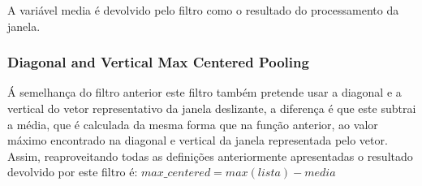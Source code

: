   A variável media é devolvido pelo filtro como o resultado do processamento da janela.


\subsubsection{Diagonal and Vertical Max Centered Pooling}\hfill\newline
  \hfill\newline
  Á semelhança do filtro anterior este filtro também pretende usar a diagonal e a vertical do vetor representativo da janela deslizante, a diferença é que este subtrai a média, que é calculada da mesma forma que na função anterior, ao valor máximo encontrado na diagonal e vertical da janela representada pelo vetor. Assim, reaproveitando todas as definições anteriormente apresentadas o resultado devolvido por este filtro é:\hfill\newline
  \hfill\newline
  $max\_centered = max(lista) - media$



